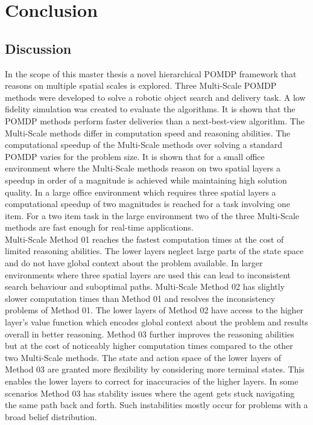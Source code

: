 \chapter{Conclusion}
\label{sec:conclusion}
\section{Discussion}
In the scope of this master thesis a novel hierarchical POMDP framework that reasons on multiple spatial scales is explored. Three Multi-Scale POMDP methods were developed to solve a robotic object search and delivery task. A low fidelity simulation was created to evaluate the algorithms. It is shown that the POMDP methods perform faster deliveries than a next-best-view algorithm. The Multi-Scale methods differ in computation speed and reasoning abilities. The computational speedup of the Multi-Scale methods over solving a standard POMDP varies for the problem size. It is shown that for a small office environment where the Multi-Scale methods reason on two spatial layers a speedup in order of a magnitude is achieved while maintaining high solution quality. In a large office environment which requires three spatial layers a computational speedup of two magnitudes is reached for a task involving one item. For a two item task in the large environment two of the three Multi-Scale methods are fast enough for real-time applications.\\

Multi-Scale Method 01 reaches the fastest computation times at the cost of limited reasoning abilities. The lower layers neglect large parts of the state space and do not have global context about the problem available. In larger environments where three spatial layers are used this can lead to inconsistent search behaviour and suboptimal paths. Multi-Scale Method 02 has slightly slower computation times than Method 01 and resolves the inconsistency problems of Method 01. The lower layers of Method 02 have access to the higher layer's value function which encodes global context about the problem and results overall in better reasoning. Method 03 further improves the reasoning abilities but at the cost of noticeably higher computation times compared to the other two Multi-Scale methods. The state and action space of the lower layers of Method 03 are granted more flexibility by considering more terminal states. This enables the lower layers to correct for inaccuracies of the higher layers. In some scenarios Method 03 has stability issues where the agent gets stuck navigating the same path back and forth. Such instabilities mostly occur for problems with a broad belief distribution.


